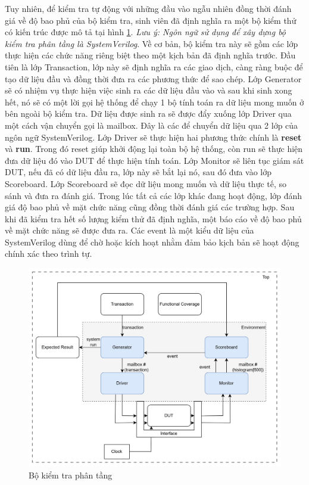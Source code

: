 Tuy nhiên, để kiểm tra tự động với những đầu vào ngẫu nhiên đồng thời đánh giá về độ bao phủ của bộ kiểm tra, sinh viên đã định nghĩa ra một bộ kiểm thử có kiến trúc được mô tả tại hình \ref{fig:myLayeredtb}. \textit{Lưu ý: Ngôn ngữ sử dụng để xây dựng bộ kiểm tra phân tầng là SystemVerilog}. Về cơ bản, bộ kiểm tra này sẽ gồm các lớp thực hiện các chức năng riêng biệt theo một kịch bản đã định nghĩa trước. Đầu tiên là lớp Transaction, lớp này sẽ định nghĩa ra các giao dịch, càng ràng buộc để tạo dữ liệu đầu và đồng thời đưa ra các phương thức để sao chép. Lớp Generator sẽ có nhiệm vụ thực hiện việc sinh ra các dữ liệu đầu vào và sau khi sinh xong hết, nó sẽ có một lời gọi hệ thống để chạy 1 bộ tính toán ra dữ liệu mong muốn ở bên ngoài bộ kiểm tra. Dữ liệu được sinh ra sẽ được đẩy xuống lớp Driver qua một cách vận chuyển gọi là mailbox. Đây là các để chuyển dữ liệu qua 2 lớp của ngôn ngữ SystemVerilog. Lớp Driver sẽ thực hiện hai phương thức chính là \textbf{reset} và \textbf{run}. Trong đó reset giúp khởi động lại toàn bộ hệ thống, còn run sẽ thực hiện đưa dữ liệu đó vào DUT để thực hiện tính toán. Lớp Monitor sẽ liên tục giám sát DUT, nếu đã có dữ liệu đầu ra, lớp này sẽ bắt lại nó, sau đó đưa vào lớp Scoreboard. Lớp Scoreboard sẽ đọc dữ liệu mong muốn và dữ liệu thực tế, so sánh và đưa ra đánh giá. Trong lúc tất cả các lớp khác đang hoạt động, lớp đánh giá độ bao phủ về mặt chức năng cũng đồng thời đánh giá các trường hợp. Sau khi đã kiểm tra hết số lượng kiểm thử đã định nghĩa, một báo cáo về độ bao phủ về mặt chức năng sẽ được đưa ra. Các event là một kiểu dữ liệu của SystemVerilog dùng để chờ hoặc kích hoạt nhằm đảm bảo kịch bản sẽ hoạt động chính xác theo trình tự.
\begin{figure}[!ht]
	\centering
	\includegraphics[width=\linewidth]{figures/myLayeredtb.png}
	\caption{Bộ kiểm tra phân tầng}
	\label{fig:myLayeredtb}
\end{figure}

